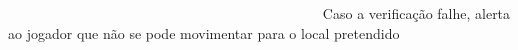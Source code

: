 ~\newline
~\newline
~\newline
~\newline
~\newline
~\newline
~\newline
~\newline
~\newline
~\newline
~\newline
~\newline
~\newline
~\newline
~\newline
~\newline
~\newline
~\newline
~\newline
~\newline
~\newline
~\newline
~\newline
~\newline
~\newline
~\newline
~\newline
 Caso a verificação falhe, alerta ao jogador que não se pode movimentar para o local pretendido ~\newline
~\newline
~\newline
~\newline
~\newline
~\newline
~\newline
~\newline
~\newline
~\newline
~\newline
~\newline
~\newline
~\newline
~\newline
~\newline
~\newline
~\newline
~\newline
~\newline
~\newline
~\newline
~\newline
~\newline
